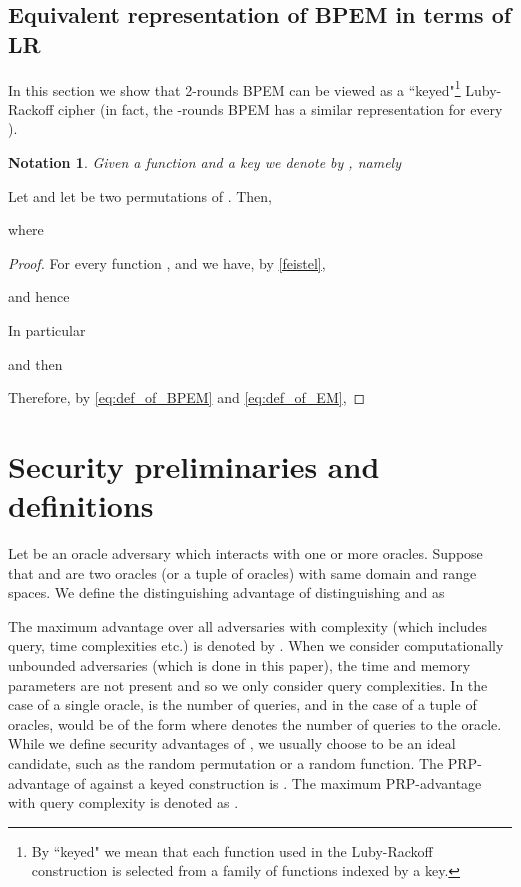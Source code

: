 \documentclass{llncs}
\newtheorem{notat}{Notation}
\begin{document}
\subsection{Equivalent representation of BPEM in terms of LR}\label{sec:BPEM_LR}
In this section we show that 2-rounds BPEM can be viewed as a ``keyed"\footnote{By ``keyed" we mean that each function used in the Luby-Rackoff construction is selected from a family of functions indexed by a key.} Luby-Rackoff cipher (in fact, the -rounds BPEM has a similar representation for every ).
\begin{notat}\label{notat:f_oplus_K}
Given a function  and a key  we denote  by , namely

\end{notat}
\begin{lemma}\label{lem:BPEM=LR}
Let  and let  be two permutations of . Then,

where

\end{lemma}
\begin{proof}
 For every function ,  and  we have, by \eqref{feistel},

and hence

In particular

and then

Therefore, by \eqref{eq:def_of_BPEM} and \eqref{eq:def_of_EM},

\end{proof}

\section{Security preliminaries and definitions}
\label{sec:prelim}
Let  be an oracle adversary which interacts with one or more oracles.
Suppose that  and  are two oracles (or a tuple of oracles) with same domain and range spaces. We define the distinguishing advantage of  distinguishing  and  as

The maximum advantage  over all adversaries with complexity  (which includes query, time complexities etc.) is denoted by . When we consider computationally unbounded adversaries (which is done in this paper), the time and memory parameters are not present and so we only consider query complexities.
In the case of a single oracle,  is the number of queries, and in the case of a tuple of oracles,  would be of the form  where  denotes the number of queries to the  oracle.
While we define security advantages of , we usually choose  to be an ideal candidate, such as the random permutation  or a random function.
The PRP-advantage of  against a keyed construction  is . The maximum PRP-advantage with query complexity  is denoted as .
\end{document}
